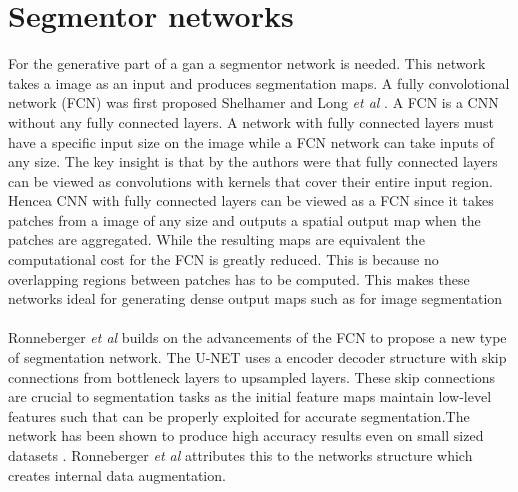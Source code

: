 \documentclass{kththesis}
\begin{document}
\section{Segmentor networks}
For the generative part of a gan a segmentor network is needed. This network takes a image as an input and produces segmentation maps.
A fully convolotional network (FCN) was first proposed Shelhamer and Long \textit{et al} \parencite{shelhamer_fully_2016}. A FCN is a CNN without any fully connected layers. A network with fully connected layers must have a specific input size on the image while a FCN network can take inputs of any size. The key insight is that by the authors were that fully connected layers can be viewed as convolutions with kernels that cover their entire input region. Hencea CNN with fully connected layers can be viewed as a FCN since it takes patches from a image of any size and outputs a spatial output map when the patches are aggregated. While the resulting maps are equivalent the computational cost for the FCN is greatly reduced. This is because no overlapping regions between patches has to be computed. This makes these networks ideal for generating dense output maps such as for image segmentation\\
\\
Ronneberger \textit{et al} \parencite{ronneberger_u-net:_2015} builds on the advancements of the FCN to propose a new type of segmentation network. The U-NET uses a encoder decoder structure with skip connections from bottleneck layers to upsampled layers. These skip connections are crucial to segmentation tasks as the initial feature
maps maintain low-level features such that can be properly exploited for accurate segmentation.The network has been shown to produce high accuracy results even on small sized datasets \parencite{son_retinal_2017, ronneberger_u-net:_2015, isola_image--image_2016, xue_segan:_2017, yang_automatic_2017}. Ronneberger \textit{et al} \parencite{ronneberger_u-net:_2015} attributes this to the networks structure which creates internal data augmentation.
\end{document}
